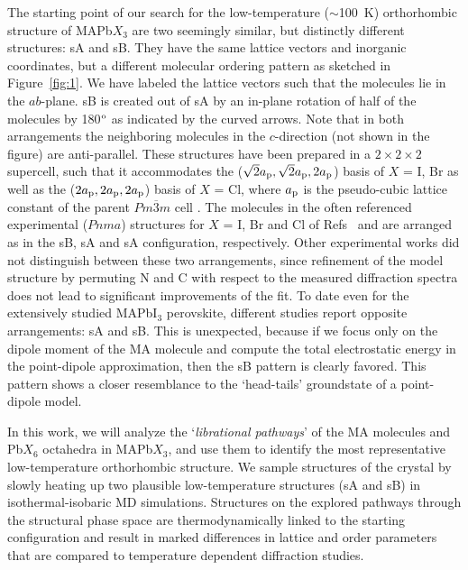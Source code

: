 \documentclass[journal=jpccck,manuscript=article,layout=twocolumn]{achemso}
\begin{document}
The starting point of our search for the low-temperature ($\sim$100~K) orthorhombic structure of MAPb$X_3$ are two seemingly similar, but distinctly different structures: sA and sB. They have the same lattice vectors and inorganic coordinates, but a different molecular ordering pattern as sketched in Figure~\ref{fig:1}. We have labeled the lattice vectors such that the molecules lie in the $ab$-plane. sB is created out of sA by an in-plane rotation of half of the molecules by 180$^{\rm o}$ as indicated by the curved arrows. Note that in both arrangements the neighboring molecules in the $c$-direction (not shown in the figure) are anti-parallel. These structures have been prepared in a $2\times2\times2$ supercell, such that it accommodates the ($\sqrt{2}a_{\rm p},\sqrt{2}a_{\rm p},2a_{\rm p}$) basis of $X$ = I, Br  as well as the ($2a_{\rm p},2a_{\rm p},2a_{\rm p}$) basis of $X$ = Cl, where $a_{\rm p}$ is the pseudo-cubic lattice constant of the parent $P{m\overline{3}m}$ cell \cite{Chi:jssc05}. The molecules in the often referenced experimental ($Pnma$) structures for $X$ = I, Br and Cl of Refs~\cite{Baikie:jmca:13,Swainson:jssc03} and \cite{Chi:jssc05} are arranged as in the sB, sA and sA configuration, respectively. Other experimental works did not distinguish between these two arrangements\cite{Stoumpos:ic13,Whitfield:sr16}, since refinement of the model structure by permuting N and C with respect to the measured diffraction spectra does not lead to significant improvements of the fit\cite{Bernasconi:jpcc18}. To date even for the extensively studied MAPbI$_3$ perovskite, different studies report opposite arrangements: sA\cite{Brivio:prb15,Omer:epjb18,Leveillee:prb19} and sB\cite{Filippetti:jpcc14,Filip:prb14,Lee:com16,Lahnsteiner:prb16}. This is unexpected, because if we focus only on the dipole moment of the MA molecule and compute the total electrostatic energy in the point-dipole approximation, then the sB pattern is clearly favored.  This pattern shows a closer resemblance to the `head-tails' groundstate of a point-dipole model\cite{Lahnsteiner:prb19}.\newline{}

In this work, we will analyze the `\textit{librational pathways}' of the MA molecules and Pb$X_6$ octahedra in MAPb$X_3$, and use them to identify the most representative low-temperature  orthorhombic structure. We sample structures of the crystal by slowly heating up two plausible low-temperature structures (sA and sB) in isothermal-isobaric MD simulations. Structures on the explored pathways through the structural phase space are thermodynamically linked to the starting configuration and result in marked differences in lattice and order parameters that are compared to temperature dependent diffraction studies.
\end{document}

